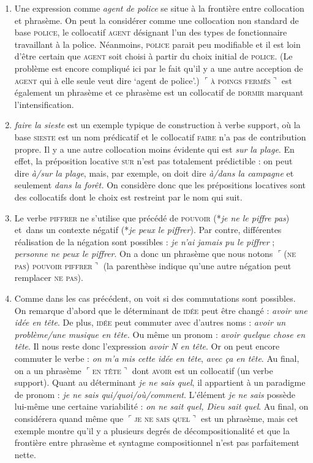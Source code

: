 {    
    \begin{enumerate}
    \item  Une expression comme \textit{agent de police} se situe à la frontière entre collocation et phrasème. On peut la considérer comme une collocation non standard de base \textsc{police}, le collocatif \textsc{agent} désignant l'un des types de fonctionnaire travaillant à la police. Néanmoins, \textsc{police} parait peu modifiable et il est loin d'être certain que \textsc{agent} soit choisi à partir du choix initial de \textsc{police}. (Le problème est encore compliqué ici par le fait qu’il y a une autre acception de \textsc{agent} qui à elle seule veut dire ‘agent de police’.) \textrm{$⌜$}\textsc{à} \textsc{poings} \textsc{fermés}\textrm{$⌝$} est également un phrasème et ce phrasème est un collocatif de \textsc{dormir} marquant l’intensification.
    \item  \textit{faire la sieste} est un exemple typique de construction à verbe support, où la base \textsc{sieste} est un nom prédicatif et le collocatif \textsc{faire} n’a pas de contribution propre. Il y a une autre collocation moins évidente qui est \textit{sur la plage}. En effet, la préposition locative \textsc{sur} n’est pas totalement prédictible : on peut dire \textit{à/sur la plage}, mais, par exemple, on doit dire \textit{à/dans la campagne} et seulement \textit{dans la forêt.} On considère donc que les prépositions locatives sont des collocatifs dont le choix est restreint par le nom qui suit.
    \item  Le verbe \textsc{piffrer} ne s’utilise que précédé de \textsc{pouvoir} (*\textit{je ne le piffre pas}) et~dans un contexte négatif (*\textit{je peux le piffrer}). Par contre, différentes réalisation de la négation sont possibles : \textit{je n’ai jamais pu le piffrer} ; \textit{personne ne peux le piffrer}. On a donc un phrasème que nous notons \textrm{$⌜$}\textsc{(ne} \textsc{pas)} \textsc{pouvoir} \textsc{piffrer}\textrm{$⌝$} (la parenthèse indique qu’une autre négation peut remplacer \textsc{ne} \textsc{pas}).
    \item  Comme dans les cas précédent, on voit si des commutations sont possibles. On remarque d’abord que le déterminant de \textsc{idée} peut être changé : \textit{avoir une idée en tête}. De plus, \textsc{idée} peut commuter avec d’autres noms : \textit{avoir un problème/une musique en tête.} Ou même un pronom : \textit{avoir quelque chose en tête}. Il nous reste donc l’expression \textit{avoir N en tête}. Or on peut encore commuter le verbe : \textit{on m’a mis cette idée en tête}, \textit{avec ça en tête}. Au final, on a un phrasème \textrm{$⌜$}\textsc{en} \textsc{tête}\textrm{$⌝$} dont \textsc{avoir} est un collocatif (un verbe support). Quant au déterminant \textit{je ne sais quel}, il appartient à un paradigme de pronom : \textit{je ne sais qui/quoi/où/comment}. L’élément \textit{je ne sais} possède lui-même une certaine variabilité : \textit{on ne sait quel, Dieu sait quel}. Au final, on considérera quand même que \textrm{$⌜$}\textsc{je} \textsc{ne} \textsc{sais} \textsc{quel}\textrm{$⌝$} est un phrasème, mais cet exemple montre qu’il y a plusieurs degrés de décompositionalité et que la frontière entre phrasème et syntagme compositionnel n’est pas parfaitement nette.

\end{enumerate}}
